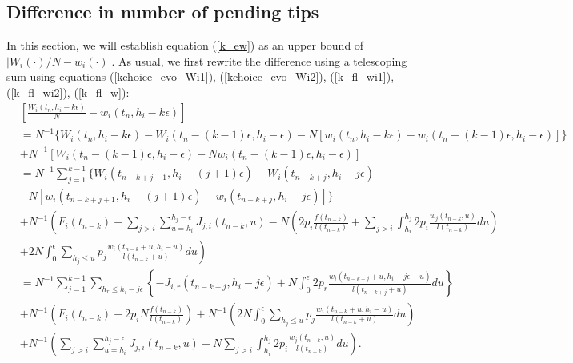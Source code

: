 \documentclass[12pt]{article}
\numberwithin{equation}{section}  %
\begin{document}
\subsection{Difference in number of pending tips}\label{k_df_pendingtips}
In this section, we will establish equation (\ref{k_ew}) as an upper bound of $|{W_i(\cdot)}/N-w_i(\cdot)|$. As usual, we first rewrite the difference using a telescoping sum using equations (\ref{kchoice_evo_Wi1}), (\ref{kchoice_evo_Wi2}), (\ref{k_fl_wi1}), (\ref{k_fl_wi2}), (\ref{k_fl_w}):
{\footnotesize
\begin{align}
 &\left[
\frac{W_i(t_n,h_i-k\epsilon)}{N}-w_i(t_n,h_i-k\epsilon)
\right]\nonumber\\
&=  N^{-1} \{
W_i(t_n,h_i-k\epsilon)
-W_i(t_n-(k-1)\epsilon,h_i-\epsilon)- N \left[ 
w_i(t_n,h_i-k\epsilon)
- w_i(t_n-(k-1)\epsilon,h_i-\epsilon)
\right]\}\nonumber\\
&+N^{-1}
\left[
W_i(t_n-(k-1)\epsilon,h_i-\epsilon)-
N w_i(t_n-(k-1)\epsilon,h_i-\epsilon)
\right]\nonumber\\
&=    N^{-1} \sum_{j=1}^{k-1} 
\Big\{
W_i(t_{n-k+j+1},h_i- (j+1) \epsilon)-W_i(t_{n-k+j},h_i-j \epsilon)\nonumber\\
&-N\left[w_i(t_{n-k+j+1},h_i- (j+1) \epsilon)-w_i(t_{n-k+j},h_i-j \epsilon)\right]
\Big\}\nonumber\\
&+   N^{-1}\left(
F_i(t_{n-k})+\sum_{j>i} \sum_{u=h_i}^{h_j-\epsilon}J_{j,i}(t_{n-k},u)-N\left(
2p_i\frac{f(t_{n-k})}{l(t_{n-k})}+\sum_{j>i} \int_{h_i}^{h_j}2p_i\frac{w_j(t_{n-k},u)}{l(t_{n-k})}du
\right)\right.\nonumber\\
&\left.+2N \int_{0}^{\epsilon} \sum_{h_j\leq u} p_j\frac{w_i(t_{n-k}+u,h_i-u)}{l(t_{n-k}+u)}du
\right)\nonumber\\
&=   N^{-1} \sum_{j=1}^{k-1} \sum_{h_r\leq h_i-j\epsilon}
\left\{
-J_{i,r}(t_{n-k+j},h_i-j\epsilon)+
N \int_{0}^{\epsilon}2 p_r\frac{w_i(t_{n-k+j}+u,h_i-j\epsilon-u)}{l(t_{n-k+j}+u)}du
\right\}\nonumber\\
&+   N^{-1}\left(
F_i(t_{n-k})-2p_i N\frac{f(t_{n-k})}{l(t_{n-k})}
\right)+ N^{-1}\left(2N\int_{0}^{\epsilon} \sum_{h_j\leq u} p_j\frac{w_i(t_{n-k}+u,h_i-u)}{l(t_{n-k}+u)}du
\right)\nonumber\\
&+N^{-1}\left(\sum_{j>i} \sum_{u=h_i}^{h_j-\epsilon}J_{j,i}(t_{n-k},u)-N
\sum_{j>i} \int_{h_i}^{h_j}2p_i\frac{w_j(t_{n-k},u)}{l(t_{n-k})}du
\right)\label{kchoice_decompose_Wi}.
\end{align}}
\end{document}
